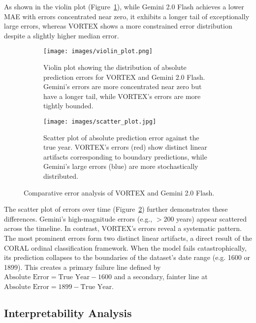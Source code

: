 \documentclass[10pt,twocolumn,letterpaper]{article}
\begin{document}
As shown in the violin plot (Figure~\ref{fig:violin_plot}), while Gemini 2.0 Flash achieves a lower MAE with errors concentrated near zero, it exhibits a longer tail of exceptionally large errors, whereas VORTEX shows a more constrained error distribution despite a slightly higher median error.

\begin{figure}[h!]
    \centering
    \begin{subfigure}{\linewidth}
        \centering
        \texttt{[image: images/violin\_plot.png]}
        \caption{Violin plot showing the distribution of absolute prediction errors for VORTEX and Gemini 2.0 Flash. Gemini's errors are more concentrated near zero but have a longer tail, while VORTEX's errors are more tightly bounded.}
        \label{fig:violin_plot}
    \end{subfigure}
    \vfill
    \begin{subfigure}{\linewidth}
        \centering
        \texttt{[image: images/scatter\_plot.jpg]}
        \caption{Scatter plot of absolute prediction error against the true year. VORTEX's errors (red) show distinct linear artifacts corresponding to boundary predictions, while Gemini's large errors (blue) are more stochastically distributed.}
        \label{fig:scatter_plot}
    \end{subfigure}
    \caption{Comparative error analysis of VORTEX and Gemini 2.0 Flash.}
    \label{fig:error_plots}
\end{figure}

The scatter plot of errors over time (Figure~\ref{fig:scatter_plot}) further demonstrates these differences. Gemini's high-magnitude errors (e.g., $>200$ years) appear scattered across the timeline. In contrast, VORTEX's errors reveal a systematic pattern. The most prominent errors form two distinct linear artifacts, a direct result of the CORAL ordinal classification framework. When the model fails catastrophically, its prediction collapses to the boundaries of the dataset's date range (e.g. 1600 or 1899). This creates a primary failure line defined by $\text{Absolute Error} = \text{True Year} - 1600$ and a secondary, fainter line at $\text{Absolute Error} = 1899 - \text{True Year}$.

\subsection{Interpretability Analysis}
\end{document}
